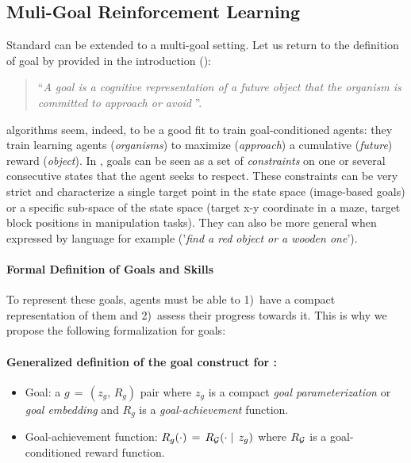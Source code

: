 \subsection{Muli-Goal Reinforcement Learning}
\label{sec:background_mg_rl}
Standard \rl can be extended to a multi-goal setting. Let us return to the definition of goal by \citet{elliot2008goal} provided in the introduction ():
\begin{quote}
   	``\textit{A goal is a cognitive representation of a future object that the organism is committed to approach or
    avoid} ''.
\end{quote}
\rl algorithms seem, indeed, to be a good fit to train goal-conditioned agents: they train learning agents (\textit{organisms}) to maximize (\textit{approach}) a cumulative (\textit{future}) reward (\textit{object}). In \rl, goals can be seen as a set of \textit{constraints} on one or several consecutive states that the agent seeks to respect. These constraints can be very strict and characterize a single target point in the state space (\eg image-based goals) or a specific sub-space of the state space (\eg target x-y coordinate in a maze, target block positions in manipulation tasks). They can also be more general when expressed by language for example (\eg '\textit{find a red object or a wooden one}'). 

\paragraph{Formal Definition of Goals and Skills}

To represent these goals, \rl agents must be able to 1)~have a compact representation of them and 2)~assess their progress towards it. This is why we propose the following formalization for \rl goals: 

\begin{tcolorbox}
\small
\paragraph{Generalized definition of the goal construct for \rl:}
\begin{itemize}
    \item \gls{Goal}: a $g\,=\,(z_g,\,R_g)$ pair where $z_g$ is a compact \textit{goal parameterization} or \textit{goal embedding} and $R_g$ is a \textit{goal-achievement} function.
    \item \gls{Goal-achievement function}: $R_g(\cdot)\,=\,R_{\mathcal{G}}(\cdot\mid\,z_g)$ where $R_{\mathcal{G}}$ is a goal-conditioned reward function.
\end{itemize}
\end{tcolorbox}

